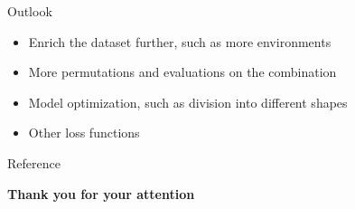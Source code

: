 \documentclass{beamer}
\begin{document}
\begin{frame}{Outlook}
    \vspace{-1.2\baselineskip}
    \begin{itemize}
        \item Enrich the dataset further, such as more environments
        \vspace{0.5\baselineskip}
        \item More permutations and evaluations on the combination
        \vspace{0.5\baselineskip}
        \item Model optimization, such as division into different shapes
        \vspace{0.5\baselineskip}
        \item Other loss functions
    \end{itemize}
\end{frame}







\renewcommand*{\bibfont}{\tiny}
\begin{frame}[t]{Reference}
    \printbibliography{}
\end{frame}



\begin{frame}[t]
    \centering
    \fontsize{24}{120}\selectfont
	\textbf{Thank you for your attention}
\end{frame}
\end{document}
